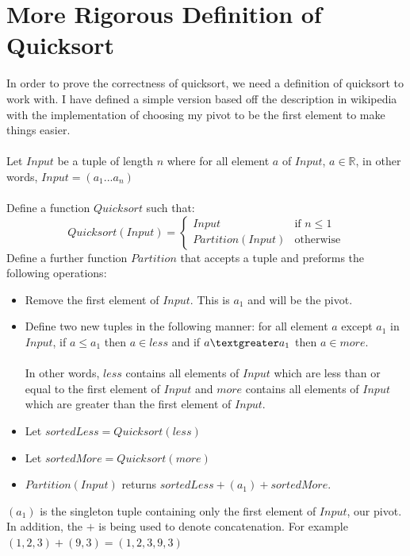 \documentclass{article}
\begin{document}
\section{More Rigorous Definition of Quicksort}
In order to prove the correctness of quicksort, we need a definition of quicksort to work with. I have defined a simple version based off the description in wikipedia with the implementation of choosing my pivot to be the first element to make things easier.
\\\\
Let $Input$ be a tuple of length $n$ where for all element $a$ of $Input$, $a \in \mathds{R}$, in other words, $Input=(a_{1}...a_{n})$
\\\\
Define a function $Quicksort$ such that:
\\
\[
 Quicksort(Input) =
  \begin{cases}
   Input                      & \text{if } n \leq 1 \\
   Partition(Input)       & \text{otherwise}
  \end{cases}
\]
Define a further function $Partition$ that accepts a tuple and preforms the following operations:
\begin{itemize}
\item Remove the first element of $Input$. This is $a_{1}$ and will be the pivot.
\item Define two new tuples in the following manner: for all element $a$ except $a_{1}$ in $Input$, if $a \leq a_{1}$ then $a \in less$ and if $a \textgreater a_{1}$ then $a \in more$.
\\\\
In other words, $less$ contains all elements of $Input$ which are less than or equal to the first element of $Input$ and $more$ contains all elements of $Input$ which are greater than the first element of $Input$. 

\item Let $sortedLess= Quicksort(less)$
\item Let $sortedMore=Quicksort(more)$
\item $Partition(Input)$ returns $sortedLess+(a_{1})+sortedMore$. 
\end{itemize}
$(a_{1})$ is the singleton tuple containing only the first element of $Input$, our pivot. In addition, the $+$ is being used to denote concatenation. For example $(1,2,3)+(9,3)=(1,2,3,9,3)$
\end{document}
